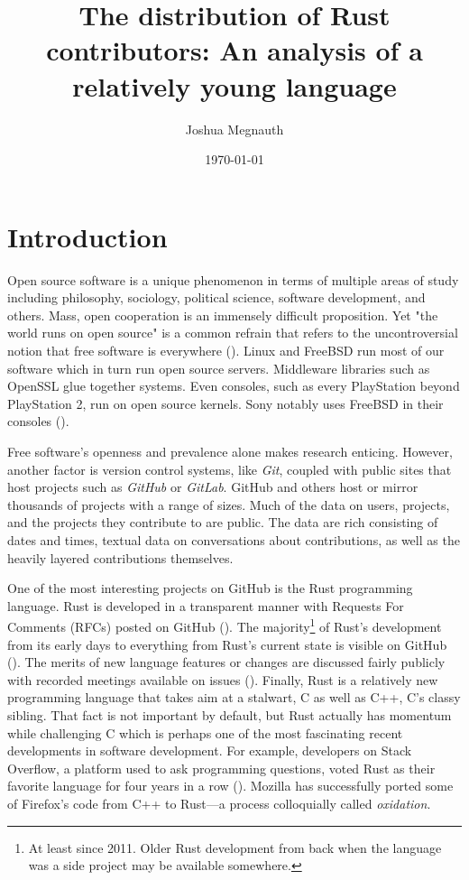 \documentclass[12pt, a4paper]{article}
\title{The distribution of Rust contributors: An analysis of a relatively young language}
\author{Joshua Megnauth}
\date{\today}
\begin{document}
\maketitle

\section{Introduction}
Open source software is a unique phenomenon in terms of multiple areas of study including philosophy, sociology, political science, software development, and others. Mass, open cooperation is an immensely difficult proposition. Yet "the world runs on open source" is a common refrain that refers to the uncontroversial notion that free software is everywhere (\cite{fossdatasci2020}). Linux and FreeBSD run most of our software which in turn run open source servers. Middleware libraries such as OpenSSL glue together systems. Even consoles, such as every PlayStation beyond PlayStation 2, run on open source kernels. Sony notably uses FreeBSD in their consoles (\cite{ps4freebsd}).

Free software's openness and prevalence alone makes research enticing. However, another factor is version control systems, like \textit{Git}, coupled with public sites that host projects such as \textit{GitHub} or \textit{GitLab}. GitHub and others host or mirror thousands of projects with a range of sizes. Much of the data on users, projects, and the projects they contribute to are public. The data are rich consisting of dates and times, textual data on conversations about contributions, as well as the heavily layered contributions themselves.

One of the most interesting projects on GitHub is the Rust programming language. Rust is developed in a transparent manner with Requests For Comments (RFCs) posted on GitHub (\cite{rustrfcs}). The majority\footnote{At least since 2011. Older Rust development from back when the language was a side project may be available somewhere.} of Rust's development from its early days to everything from Rust's current state is visible on GitHub (\cite{rustmainrepo}). The merits of new language features or changes are discussed fairly publicly with recorded meetings available on issues (\cite{rustteammeets}). Finally, Rust is a relatively new programming language that takes aim at a stalwart, C as well as C++, C's classy sibling. That fact is not important by default, but Rust actually has momentum while challenging C which is perhaps one of the most fascinating recent developments in software development. For example, developers on Stack Overflow, a platform used to ask programming questions, voted Rust as their favorite language for four years in a row (\cite{stackoverflowdevsurvey2020}). Mozilla has successfully ported some of Firefox's code from C++ to Rust---a process colloquially called \textit{oxidation}.
\end{document}
